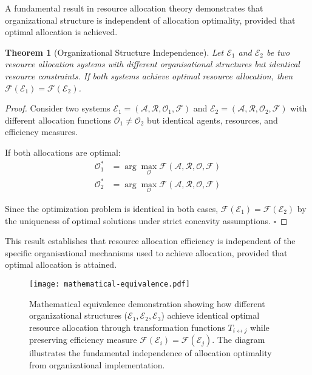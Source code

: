 \documentclass[12pt,a4paper]{article}
\newtheorem{theorem}{Theorem}
\begin{document}
A fundamental result in resource allocation theory demonstrates that organizational structure is independent of allocation optimality, provided that optimal allocation is achieved.

\begin{theorem}[Organizational Structure Independence]
Let $\mathcal{E}_1$ and $\mathcal{E}_2$ be two resource allocation systems with different organisational structures but identical resource constraints. If both systems achieve optimal resource allocation, then $\mathcal{F}(\mathcal{E}_1) = \mathcal{F}(\mathcal{E}_2)$.
\end{theorem}

\begin{proof}
Consider two systems $\mathcal{E}_1 = (\mathcal{A}, \mathcal{R}, \mathcal{O}_1, \mathcal{F})$ and $\mathcal{E}_2 = (\mathcal{A}, \mathcal{R}, \mathcal{O}_2, \mathcal{F})$ with different allocation functions $\mathcal{O}_1 \neq \mathcal{O}_2$ but identical agents, resources, and efficiency measures.

If both allocations are optimal:
\begin{align}
\mathcal{O}^*_1 &= \arg\max_{\mathcal{O}} \mathcal{F}(\mathcal{A}, \mathcal{R}, \mathcal{O}, \mathcal{F}) \\
\mathcal{O}^*_2 &= \arg\max_{\mathcal{O}} \mathcal{F}(\mathcal{A}, \mathcal{R}, \mathcal{O}, \mathcal{F})
\end{align}

Since the optimization problem is identical in both cases, $\mathcal{F}(\mathcal{E}_1) = \mathcal{F}(\mathcal{E}_2)$ by the uniqueness of optimal solutions under strict concavity assumptions. $\square$
\end{proof}

This result establishes that resource allocation efficiency is independent of the specific organisational mechanisms used to achieve allocation, provided that optimal allocation is attained.

\begin{figure}[H]
\centering
\texttt{[image: mathematical-equivalence.pdf]}
\caption{Mathematical equivalence demonstration showing how different organizational structures ($\mathcal{E}_1, \mathcal{E}_2, \mathcal{E}_3$) achieve identical optimal resource allocation through transformation functions $T_{i \leftrightarrow j}$ while preserving efficiency measure $\mathcal{F}(\mathcal{E}_i) = \mathcal{F}(\mathcal{E}_j)$. The diagram illustrates the fundamental independence of allocation optimality from organizational implementation.}
\label{fig:mathematical-equivalence}
\end{figure}
\end{document}
